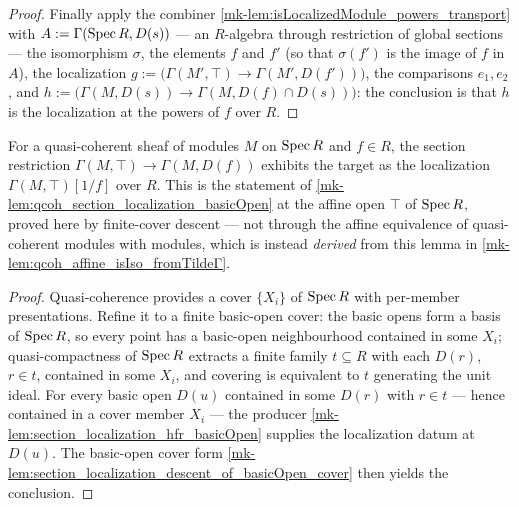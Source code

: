 \begin{proof}
  Finally apply the combiner \ref{mk-lem:isLocalizedModule_powers_transport} with
  \(A := \Gamma(\operatorname{Spec} R, D(s))\) — an \(R\)-algebra through restriction of global
  sections — the isomorphism \(\sigma\), the elements \(f\) and \(f'\) (so that
  \(\sigma(f')\) is the image of \(f\) in \(A\)), the localization
  \(g := \bigl(\Gamma(M', \top) \to \Gamma(M', D(f'))\bigr)\), the comparisons
  \(e_1, e_2\), and \(h := \bigl(\Gamma(M, D(s)) \to \Gamma(M, D(f) \cap D(s))\bigr)\):
  the conclusion is that \(h\) is the localization at the powers of \(f\) over \(R\).
\end{proof}

\begin{lemma}
  \label{mk-lem:section_localization_descent}
  \leanok

  For a quasi-coherent sheaf of modules \(M\) on \(\operatorname{Spec} R\) and \(f \in R\), the section
  restriction \(\Gamma(M, \top) \to \Gamma(M, D(f))\) exhibits the target as the
  localization \(\Gamma(M, \top)[1/f]\) over \(R\). This is the statement of
  \ref{mk-lem:qcoh_section_localization_basicOpen} at the affine open \(\top\) of
  \(\operatorname{Spec} R\), proved here by finite-cover descent --- not through the affine
  equivalence of quasi-coherent modules with modules, which is instead \emph{derived}
  from this lemma in \ref{mk-lem:qcoh_affine_isIso_fromTildeΓ}.
\end{lemma}
\begin{proof}
  \leanok
  Quasi-coherence provides a cover \(\{X_i\}\) of \(\operatorname{Spec} R\) with per-member
  presentations. Refine it to a finite basic-open cover: the basic opens form a basis of
  \(\operatorname{Spec} R\), so every point has a basic-open neighbourhood contained in some \(X_i\);
  quasi-compactness of \(\operatorname{Spec} R\) extracts a finite family \(t \subseteq R\) with each
  \(D(r)\), \(r \in t\), contained in some \(X_i\), and covering is equivalent to \(t\)
  generating the unit ideal. For every basic open \(D(u)\) contained in some \(D(r)\)
  with \(r \in t\) — hence contained in a cover member \(X_i\) — the producer
  \ref{mk-lem:section_localization_hfr_basicOpen} supplies the localization datum at
  \(D(u)\). The basic-open cover form
  \ref{mk-lem:section_localization_descent_of_basicOpen_cover} then yields the conclusion.
\end{proof}


